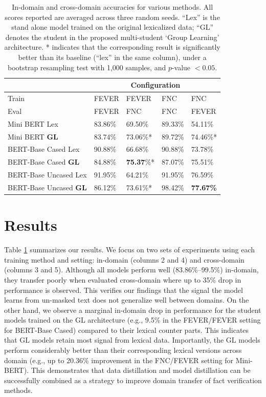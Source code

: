 \begin{table}[h]
\begin{center}
\footnotesize
\begin{tabular}{p{20mm}p{9mm}p{9mm}|p{9mm}p{9mm}}
\toprule
& \multicolumn{4}{c}{Configuration} \\
\midrule
Train  & {FEVER}&{FEVER}&{FNC}&{{FNC}} \\
Eval  & {FEVER}&{{FNC}}&{FNC}&{{FEVER}} \\
\midrule
Mini BERT Lex &83.86\%&69.50\%&89.33\%&54.11\%\\
Mini BERT \bf{GL} &83.74\%&{73.06\%*}&89.72\%&{74.46\%*}\\
\midrule
BERT-Base Cased Lex&90.88\%&66.68\%&90.88\%&73.78\%\\
BERT-Base Cased \bf{GL}&84.88\%&{\textbf{75.37}\%*}&87.07\%&75.51\%\\
\midrule
BERT-Base Uncased Lex&91.95\%&64.21\%&91.95\%&76.59\%\\
BERT-Base Uncased \bf{GL} &86.12\%&{73.61\%*}&98.42\%&\textbf{77.67\%}\\

\bottomrule
\end{tabular}
\end{center}
\caption{ In-domain and cross-domain accuracies for various methods.
All scores reported are averaged across three random seeds.
``Lex'' is the stand alone model trained on the original lexicalized data;  ``GL'' denotes the student in the proposed multi-student `Group Learning' architecture. * indicates that the corresponding result is significantly better than its baseline (``lex'' in the same column), under a bootstrap resampling test with 1,000 samples, and $p$-value $< 0.05$. }
\label{results_fnc}
\vspace*{-5mm}
\end{table}

\section{Results}
Table \ref{results_fnc} summarizes our results. We focus on two sets of experiments using each training method and setting: in-domain (columns 2 and 4) and cross-domain (columns 3 and 5).
Although all models perform well (83.86\%--99.5\%) in-domain, they transfer poorly when evaluated cross-domain where up to 35\% drop in performance is observed. This verifies our findings that the signal the model learns from un-masked text does not generalize well between domains.
On the other hand, we observe a marginal in-domain drop in performance for the student models trained on the GL architecture (e.g., 9.5\% in the FEVER/FEVER setting for BERT-Base Cased) compared to their lexical counter parts. This indicates that GL models retain most signal from lexical data. Importantly, the GL models perform considerably better than their corresponding lexical versions across domain (e.g., up to 20.36\% improvement in the FNC/FEVER setting for Mini-BERT). This demonstrates that data distillation and model distillation can be successfully combined as a strategy to improve domain transfer of fact verification methods.

